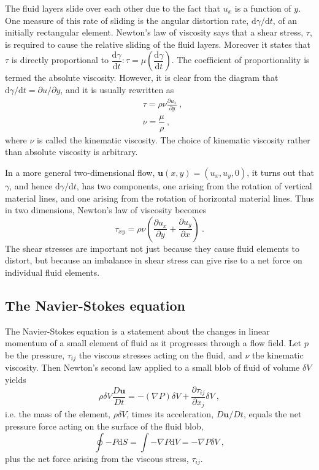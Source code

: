 \documentclass[12pt,a4paper]{article}
\renewcommand{\vec}[1]{\boldsymbol{#1}}
\newcommand{\dif}{\mathrm{d}}
\begin{document}
The fluid layers slide over each other due to the fact that $u_x$ is a function of $y$. One measure of this rate of sliding is the angular distortion rate, $\dif \gamma/\dif t$, of an initially rectangular element. Newton's law of viscosity says that a shear stress, $\tau$, is required to cause the relative sliding of the fluid layers. Moreover it states that $\tau$ is directly proportional to $\dfrac{\dif \gamma}{\dif t}: \tau = \mu \left(\dfrac{\dif \gamma}{\dif t} \right)$. The coefficient of proportionality is termed the absolute viscosity. However, it is clear from the diagram that $\dif \gamma/\dif t = \partial u/\partial y$, and it is usually rewritten as
\begin{align}
& \tau = \rho \nu \frac{\partial u_x}{\partial y} ~,\\
& \nu = \dfrac{\mu}{\rho} ~,
\end{align}
where $\nu$ is called the kinematic viscosity. The choice of kinematic viscosity rather than absolute viscosity is arbitrary.

In a more general two-dimensional flow, $\vec{u}(x, y) = (u_x, u_y, 0)$, it turns out that $\gamma$, and hence $\dif \gamma/\dif t$, has two components, one arising from the rotation of vertical material lines, and one arising from the rotation of horizontal material lines. Thus in two dimensions, Newton's law of viscosity becomes
\begin{equation}
\tau_{xy} = \rho \nu \left(\frac{\partial u_x}{\partial y} +\frac{\partial u_y}{\partial x} \right) ~.
\end{equation}
The shear stresses are important not just because they cause fluid elements to distort, but because an imbalance in shear stress can give rise to a net force on individual fluid elements. 

\subsection{The Navier-Stokes equation}
The Navier-Stokes equation is a statement about the changes in linear momentum of a small element of fluid as it progresses through a flow field. Let $p$ be the pressure, $\tau_{ij}$ the viscous stresses acting on the fluid, and $\nu$ the kinematic viscosity. Then Newton's second law applied to a small blob of fluid of volume $\delta V$ yields
\begin{equation}
\rho \delta V \frac{D \vec{u}}{D t} = -(\nabla P)\delta V +\frac{\partial \tau_{ij}}{\partial x_j} \delta V ~,
\end{equation}
i.e. the mass of the element, $\rho \delta V$, times its acceleration, $D \vec{u}/D t$, equals the net pressure force acting on the surface of the fluid blob,
\begin{equation}
\oint -P \dif S = \int -\nabla P \dif V = -\nabla P  \delta V ~,
\end{equation}
plus the net force arising from the viscous stress, $\tau_{ij}$.
\end{document}
